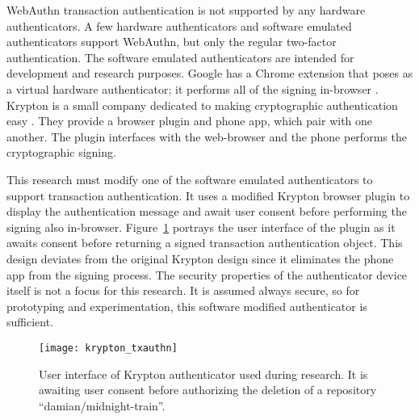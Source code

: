 \iffalse
, but none support the transaction authentication extension.

are dedicated hardware devices required by the threat model. Also, these authenticators only support regular WebAuthn two-factor authentication, not the transaction authentication extension. 
\fi

WebAuthn transaction authentication is not supported by any hardware authenticators. A few hardware authenticators and software emulated authenticators support WebAuthn, but only the regular two-factor authentication. The software emulated authenticators are intended for development and research purposes. Google has a Chrome extension that poses as a virtual hardware authenticator; it performs all of the signing in-browser \cite{virtual-authenticators-tab}. Krypton is a small company dedicated to making cryptographic authentication easy \cite{krypton}. They provide a browser plugin and phone app, which pair with one another. The plugin interfaces with the web-browser and the phone performs the cryptographic signing. 

This research must modify one of the software emulated authenticators to support transaction authentication. It uses a modified Krypton browser plugin to display the authentication message and await user consent before performing the signing also in-browser. Figure~\ref{Fig:KryptonAuthenticator} portrays the user interface of the plugin as it awaits consent before returning a signed transaction authentication object. This design deviates from the original Krypton design since it eliminates the phone app from the signing process. The security properties of the authenticator device itself is not a focus for this research. It is assumed always secure, so for prototyping and experimentation, this software modified authenticator is sufficient.

\begin{figure}[h]
  \centering
  \texttt{[image: krypton\_txauthn]}
  \caption{User interface of Krypton authenticator used during research. It is awaiting user consent before authorizing the deletion of a repository ``damian/midnight-train''.}
  \label{Fig:KryptonAuthenticator}
\end{figure}



